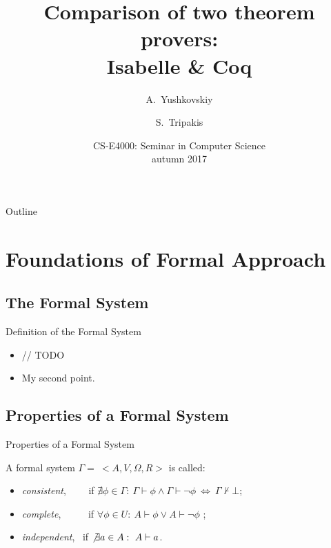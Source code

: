 \documentclass[aspectratio=169]{beamer}
\title{Comparison of two theorem provers: \\ Isabelle \& Coq}
\author{A.~Yushkovskiy \and S.~Tripakis}
\institute[AaltoUniversity] %
{
  Department of Computer Science \\
  School of Science \\
  \textbf{Aalto University}
  }
\date{ $ $\\ CS-E4000: Seminar in Computer Science \\ autumn 2017 }
\begin{document}
\begin{frame}
  \titlepage
\end{frame}

\begin{frame}{Outline}
  \tableofcontents
\end{frame}

\section{Foundations of Formal Approach}

\subsection{The Formal System}

\begin{frame}{Definition of the Formal System}%
  \begin{itemize}
  \item {
    // TODO
  }
  \item {
    My second point.
  }
  \end{itemize}
\end{frame}

\subsection{Properties of a Formal System}
\begin{frame}{Properties of a Formal System}

A formal system $\Gamma = \ <A, V, \Omega, R>$ is called:

\begin{itemize}
   \item  \textit{consistent}, \ \ \ \ if $\nexists \phi \in \Gamma: \ \Gamma \vdash \phi \land  \Gamma \vdash \neg \phi  \ \Leftrightarrow \ \Gamma \nvdash \bot$; \\
  \item \textit{complete}, \ \ \ \ \ if $\forall \phi \in U: \ A \vdash \phi \lor A \vdash \neg \phi$ ; \\
  \item \textit{independent}, \ if $\not \exists a \in A: \ A \vdash a$.
\end{itemize}

\end{frame}
\end{document}
